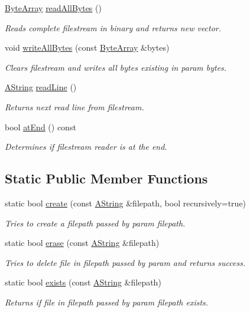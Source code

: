 \begin{DoxyCompactItemize}
\mbox{\hyperlink{class_byte_array}{Byte\+Array}} \mbox{\hyperlink{class_file_acc44c7f319708f0e378c08492d178fc0}{read\+All\+Bytes}} ()
\begin{DoxyCompactList}\small\item\em Reads complete filestream in binary and returns new vector. \end{DoxyCompactList}\item 
void \mbox{\hyperlink{class_file_a7fd6b7ead40f02ea7e578e281465bf80}{write\+All\+Bytes}} (const \mbox{\hyperlink{class_byte_array}{Byte\+Array}} \&bytes)
\begin{DoxyCompactList}\small\item\em Clears filestream and writes all bytes existing in param bytes. \end{DoxyCompactList}\item 
\mbox{\hyperlink{class_a_string}{A\+String}} \mbox{\hyperlink{class_file_ad65ed49713d0b0e11a439cb3bc148171}{read\+Line}} ()
\begin{DoxyCompactList}\small\item\em Returns next read line from filestream. \end{DoxyCompactList}\item 
bool \mbox{\hyperlink{class_file_a6f433c3bbc327cf15217d2f3c4cd043d}{at\+End}} () const
\begin{DoxyCompactList}\small\item\em Determines if filestream reader is at the end. \end{DoxyCompactList}\end{DoxyCompactItemize}
\subsection*{Static Public Member Functions}
\begin{DoxyCompactItemize}
\item 
static bool \mbox{\hyperlink{class_file_a255061b2a5ed2db1c9f8fce9ab78af4e}{create}} (const \mbox{\hyperlink{class_a_string}{A\+String}} \&filepath, bool recursively=true)
\begin{DoxyCompactList}\small\item\em Tries to create a filepath passed by param filepath. \end{DoxyCompactList}\item 
static bool \mbox{\hyperlink{class_file_a068634b55657c13f0f79691434c399b1}{erase}} (const \mbox{\hyperlink{class_a_string}{A\+String}} \&filepath)
\begin{DoxyCompactList}\small\item\em Tries to delete file in filepath passed by param and returns success. \end{DoxyCompactList}\item 
static bool \mbox{\hyperlink{class_file_a7b28f74e97c46f0b95ec159c2425dca0}{exists}} (const \mbox{\hyperlink{class_a_string}{A\+String}} \&filepath)
\begin{DoxyCompactList}\small\item\em Returns if file in filepath passed by param filepath exists. \end{DoxyCompactList}\end{DoxyCompactItemize}


